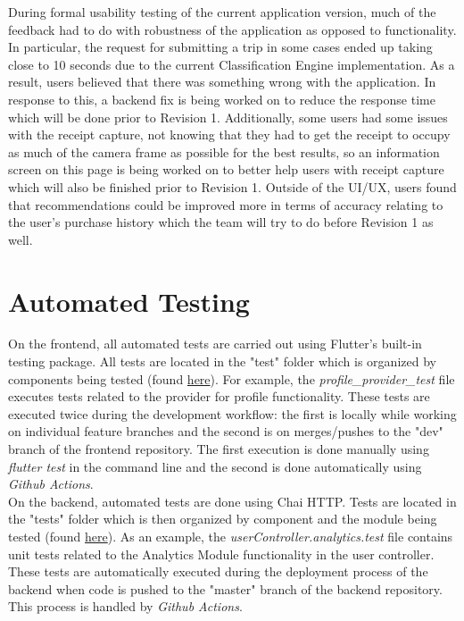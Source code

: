 \documentclass[12pt, titlepage]{article}
\begin{document}
During formal usability testing of the current application version, much of the feedback had to do with robustness
of the application as opposed to functionality. In particular, the request for submitting a trip
in some cases ended up taking close to 10 seconds due to the current Classification Engine implementation. As
a result, users believed that there was something wrong with the application. In response to this,
a backend fix is being worked on to reduce the response time which will be done prior to Revision 1.
Additionally, some users had some issues with the receipt capture, not knowing that they had to get the
receipt to occupy as much of the camera frame as possible for the best results, so an information screen
on this page is being worked on to better help users with receipt capture which will also be finished
prior to Revision 1. Outside of the UI/UX, users found that recommendations could be improved more
in terms of accuracy relating to the user's purchase history which the team will try to do before Revision 1
as well.

\section{Automated Testing}

On the frontend, all automated tests are carried out using Flutter's built-in testing package.
All tests are located in the "test" folder which is organized by components being tested (found 
\href{https://github.com/allanfang1/grocery_spending_tracker_app/tree/main}{here}). For example,
the \textit{profile\_provider\_test} file executes tests related to the provider for profile functionality.
These tests are executed twice during the development workflow: the first is locally while working on
individual feature branches and the second is on merges/pushes to the "dev" branch of the frontend repository.
The first execution is done manually using \textit{flutter test} in the command line and the second is done
automatically using \textit{Github Actions}.\\

On the backend, automated tests are done using Chai HTTP. Tests are located in the "tests" folder which
is then organized by component and the module being tested 
(found \href{https://github.com/grocery-spending-tracker/grocery-spending-tracker-backend/tree/master/tests}{here}).
As an example, the \textit{userController.analytics.test} file contains unit tests related to the Analytics Module
functionality in the user controller.
These tests are automatically executed during the deployment process of the backend when code is pushed to the
"master" branch of the backend repository. This process is handled by \textit{Github Actions}.
		
\end{document}
